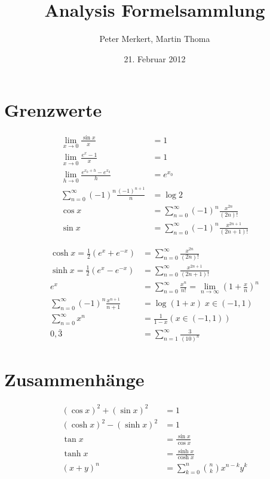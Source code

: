 \documentclass[a4paper,10pt]{article}
\begin{document}
\title{Analysis Formelsammlung}
\author{Peter Merkert, Martin Thoma}
\date{21. Februar 2012}

\section{Grenzwerte}
\begin{table}[ht]
\begin{minipage}[b]{0.5\linewidth}\centering

\begin{align*}
    \lim_{x \to 0} \frac {\sin x}{x}  &= 1 \\
    \lim_{x \to 0} \frac {e^x - 1}{x} &= 1 \\
    \lim_{h \to 0} \frac {e^{{x_0} + h} - e^{x_0}}{h} &= e^{x_0} \\
    \sum_{n = 0}^{\infty} (-1)^n \frac {(-1)^{n + 1}}{n} &= \log 2 \\
    \cos x    &= \sum_{n = 0}^{\infty} (-1)^n \frac {x^{2n}}{(2n)!}  \\
    \sin x    &= \sum_{n = 0}^{\infty} (-1)^n \frac {x^{2n + 1}}{(2n + 1)!}
\end{align*}

\end{minipage}
\hspace{0.5cm}
\begin{minipage}[b]{0.5\linewidth}
\centering

\begin{align*}
\cosh x = \frac {1}{2} (e^x + e^{-x}) &= \sum_{n = 0}^{\infty} \frac {x^{2n}}{(2n)!} \\
\sinh x = \frac {1}{2} (e^x - e^{-x}) &= \sum_{n = 0}^{\infty} \frac {x^{2n + 1}}{(2n + 1)!} \\
e^x &= \sum_{n = 0}^{\infty} \frac {x^n}{n!} = \lim_{n\to\infty} \left (1+\frac{x}{n} \right )^n\\
\sum_{n = 0}^{\infty} (-1)^n \frac {x^{n + 1}}{n + 1} &= \log (1+x) \; x \in (-1,1) \\
\sum_{n = 0}^{\infty} x^n &= \frac {1}{1 - x}    (x \in (-1,1)) \\
0,\bar{3} &= \sum_{n = 1}^{\infty} \frac {3}{(10)^n}
\end{align*}

\end{minipage}
\end{table}

\section{Zusammenhänge}
\begin{align*}
    (\cos x)^2 + (\sin x)^2 &= 1 \\
    (\cosh x)^2 - (\sinh x)^2 &= 1 \\
    \tan x  &= \frac {\sin x}{\cos x} \\
    \tanh x &= \frac {\sinh x}{\cosh x} \\
  (x + y)^n &= \sum_{k=0}^{n} \binom{n}{k} x^{n-k} y^k
\end{align*}
\end{document}
